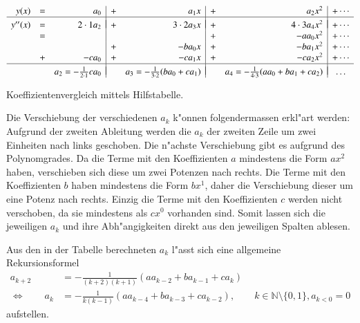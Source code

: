 \begin{table}
	\centering
	\begin{equation*}
		\begin{array}{r c r | c r | c r | c r c}
		y(x) & = &
		a_0 & + & a_1x & + & a_2x^2 & + \dotsb
		\\
		\hline&&&&&&&\\[-2ex]
		y''(x) & = &
		2\cdot1 a_2 & + & 3\cdot2 a_3x & + & 4\cdot3 a_4x^2 & + \dotsb
		\\
		& = &
		& & & + &- aa_0x^2 & + \dotsb
		\\
		& &
		& + &- ba_0x & + &- ba_1x^2 & + \dotsb
		\\
		& + &
		-ca_0 & + &- ca_1x & + &- ca_2x^2 & + \dotsb
		\\
		\hline&&&&&&&\\[-2ex]
		& &
		a_2 = -\frac{1}{2 \cdot 1}ca_0
		& & a_3 = -\frac{1}{3 \cdot 2}(ba_0+ca_1)
		& & a_4 = -\frac{1}{4 \cdot 3}(aa_0+ba_1+ca_2)
		& \dots
		\end{array}
	\end{equation*}
	\caption{Koeffizientenvergleich mittels Hilfstabelle.}
	\label{tab:wellen:koeffizietenvergleichtabelle}
\end{table}

Die Verschiebung der verschiedenen $a_k$ k"onnen folgendermassen erkl"art 
werden: Aufgrund der zweiten Ableitung werden die $a_k$ der zweiten Zeile um 
zwei Einheiten nach links geschoben. Die n"achste Verschiebung gibt es aufgrund 
des Polynomgrades. Da die Terme mit den Koeffizienten $a$ mindestens die Form 
$ax^2$ haben, verschieben sich diese um zwei Potenzen nach rechts. Die Terme 
mit den Koeffizienten $b$ haben mindestens die Form $bx^1$, daher die 
Verschiebung dieser um eine Potenz nach rechts. Einzig die Terme mit den 
Koeffizienten $c$ werden nicht verschoben, da sie mindestens als $cx^0$ 
vorhanden sind. Somit lassen sich die jeweiligen $a_k$ und ihre Abh"angigkeiten 
direkt aus den jeweiligen Spalten ablesen.

Aus den in der Tabelle berechneten $a_k$ l"asst sich eine allgemeine 
Rekursionsformel
\begin{equation*}
	\begin{split}
		a_{k+2} &= -\frac{1}{(k+2)(k+1)} (aa_{k-2}+ba_{k-1}+ca_k) \\
		\Leftrightarrow \qquad
		a_k &= -\frac{1}{k(k-1)} (aa_{k-4}+ba_{k-3}+ca_{k-2}), \qquad k \in 
		\mathbb{N} \setminus \{0, 1\}, a_{k<0} = 0
	\end{split}
\end{equation*}
aufstellen.